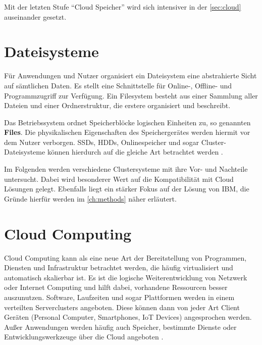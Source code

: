 Mit der letzten Stufe ``Cloud Speicher'' wird sich intensiver in der \autoref{sec:cloud} auseinander gesetzt.



\newpage

\section{Dateisysteme} \label{sec:filesystems}

Für Anwendungen und Nutzer organisiert ein Dateisystem eine abstrahierte Sicht auf sämtlichen Daten. Es stellt eine Schnittstelle für Online-, Offline- und Programmzugriff zur Verfügung. Ein Filesystem besteht aus einer Sammlung aller Dateien und einer Ordnerstruktur, die erstere organisiert und beschreibt. 

Das Betriebssystem ordnet Speicherblöcke logischen Einheiten zu, so genannten \textbf{Files}. Die physikalischen Eigenschaften des Speichergerätes werden hiermit vor dem Nutzer verborgen. SSDs, HDDs, Onlinespeicher und sogar Cluster-Dateisysteme können hierdurch auf die gleiche Art betrachtet werden \parencite{silberschatz.2012}.

Im Folgenden werden verschiedene Clustersysteme mit ihre Vor- und Nachteile untersucht. Dabei wird besonderer Wert auf die Kompatibilität mit Cloud Lösungen gelegt. Ebenfalls liegt ein stärker Fokus auf der Lösung von IBM, die Gründe hierfür werden im \autoref{ch:methods} näher erläutert.



\section{Cloud Computing}\label{sec:cloud}

Cloud Computing kann als eine neue Art der Bereitstellung von Programmen, Diensten und Infrastruktur betrachtet werden, die häufig virtualisiert und automatisch skalierbar ist. Es ist die logische Weiterentwicklung von Netzwerk oder Internet Computing und hilft dabei, vorhandene Ressourcen besser auszunutzen. 
Software, Laufzeiten und sogar Plattformen werden in einem verteilten Serverclusters angeboten. Diese können dann von jeder Art  Client Geräten (Personal Computer, Smartphones, \ac{IoT} Devices) angesprochen werden. Außer Anwendungen werden häufig  auch Speicher, bestimmte Dienste oder Entwicklungswerkzeuge über die Cloud angeboten \parencite[S. 3]{furth.2010}.


